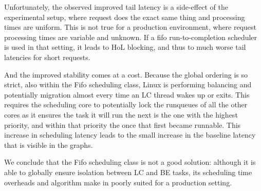 Unfortunately, the observed improved tail latency is a side-effect of the
experimental setup, where request does the exact same thing and processing times
are uniform. This is not true for a production environment, where request
processing times are variable and unknown. If a fifo run-to-completion scheduler
is used in that setting, it leads to HoL blocking, and thus to much worse tail
latencies for short requests.

And the improved stability comes at a cost. Because the global ordering is so
strict, also within the Fifo scheduling class, Linux is performing balancing and
potentially migration almost every time an LC thread wakes up or exits. This
requires the scheduling core to potentially lock the runqueues of all the other
cores as it ensures the task it will run the next is the one with the highest
priority, and within that priority the once that first became runnable. This
increase in scheduling latency leads to the small increase in the baseline
latency that is visible in the graphs.

We conclude that the Fifo scheduling class is not a good solution: although it
is able to globally ensure isolation between LC and BE tasks, its scheduling
time overheads and algorithm make in poorly suited for a production setting.



